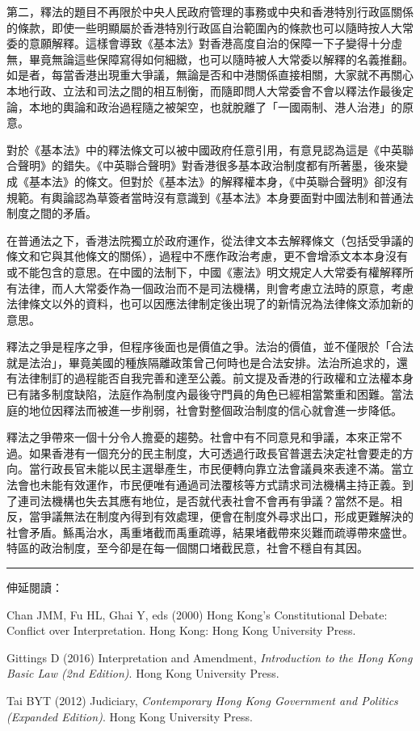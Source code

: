 第二，釋法的題目不再限於中央人民政府管理的事務或中央和香港特別行政區關係的條款，即使一些明顯屬於香港特別行政區自治範圍內的條款也可以隨時按人大常委的意願解釋。這樣會導致《基本法》對香港高度自治的保障一下子變得十分虛無，畢竟無論這些保障寫得如何細緻，也可以隨時被人大常委以解釋的名義推翻。如是者，每當香港出現重大爭議，無論是否和中港關係直接相關，大家就不再關心本地行政、立法和司法之間的相互制衡，而隨即問人大常委會不會以釋法作最後定論，本地的輿論和政治過程隨之被架空，也就脫離了「一國兩制、港人治港」的原意。

對於《基本法》中的釋法條文可以被中國政府任意引用，有意見認為這是《中英聯合聲明》的錯失。《中英聯合聲明》對香港很多基本政治制度都有所著墨，後來變成《基本法》的條文。但對於《基本法》的解釋權本身，《中英聯合聲明》卻沒有規範。有輿論認為草簽者當時沒有意識到《基本法》本身要面對中國法制和普通法制度之間的矛盾。

在普通法之下，香港法院獨立於政府運作，從法律文本去解釋條文（包括受爭議的條文和它與其他條文的關係），過程中不應作政治考慮，更不會增添文本本身沒有或不能包含的意思。在中國的法制下，中國《憲法》明文規定人大常委有權解釋所有法律，而人大常委作為一個政治而不是司法機構，則會考慮立法時的原意，考慮法律條文以外的資料，也可以因應法律制定後出現了的新情況為法律條文添加新的意思。

釋法之爭是程序之爭，但程序後面也是價值之爭。法治的價值，並不僅限於「合法就是法治」，畢竟美國的種族隔離政策曾己何時也是合法安排。法治所追求的，還有法律制訂的過程能否自我完善和達至公義。前文提及香港的行政權和立法權本身已有諸多制度缺陷，法庭作為制度內最後守門員的角色已經相當繁重和困難。當法庭的地位因釋法而被進一步削弱，社會對整個政治制度的信心就會進一步降低。

釋法之爭帶來一個十分令人擔憂的趨勢。社會中有不同意見和爭議，本來正常不過。如果香港有一個充分的民主制度，大可透過行政長官普選去決定社會要走的方向。當行政長官未能以民主選舉產生，市民便轉向靠立法會議員來表達不滿。當立法會也未能有效運作，市民便唯有通過司法覆核等方式請求司法機構主持正義。到了連司法機構也失去其應有地位，是否就代表社會不會再有爭議？當然不是。相反，當爭議無法在制度內得到有效處理，便會在制度外尋求出口，形成更難解決的社會矛盾。鯀禹治水，禹重堵截而禹重疏導，結果堵截帶來災難而疏導帶來盛世。特區的政治制度，至今卻是在每一個關口堵截民意，社會不穩自有其因。

\rule[-10pt]{15cm}{0.05em}

伸延閱讀：

Chan JMM, Fu HL, Ghai Y, eds (2000) Hong Kong's Constitutional Debate: Conflict over Interpretation. Hong Kong: Hong Kong University Press.

Gittings D (2016) Interpretation and Amendment, \textit{Introduction to the Hong Kong Basic Law (2nd Edition)}. Hong Kong University Press.

Tai BYT (2012) Judiciary, \textit{Contemporary Hong Kong Government and Politics (Expanded Edition)}. Hong Kong University Press.